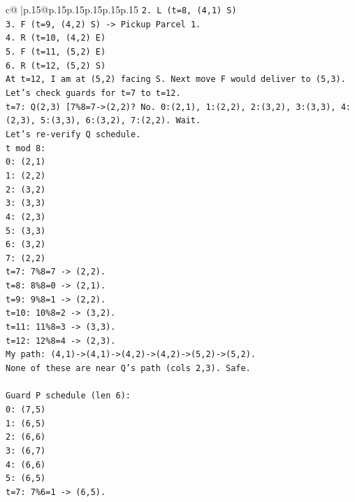 \documentclass{article}
\begin{document}
{\begin{supertabular}{c@{$\;$}|p{.15\linewidth}@{}p{.15\linewidth}p{.15\linewidth}p{.15\linewidth}p{.15\linewidth}p{.15\linewidth}}
{{{\texttt{2. L (t=8, (4,1) S)} \\
\texttt{3. F (t=9, (4,2) S) {-}> Pickup Parcel 1.} \\
\texttt{4. R (t=10, (4,2) E)} \\
\texttt{5. F (t=11, (5,2) E)} \\
\texttt{6. R (t=12, (5,2) S)} \\
\texttt{At t=12, I am at (5,2) facing S. Next move F would deliver to (5,3).} \\
\texttt{Let's check guards for t=7 to t=12.} \\
\texttt{t=7: Q(2,3) {[}7\%8=7{-}>(2,2)? No. 0:(2,1), 1:(2,2), 2:(3,2), 3:(3,3), 4:(2,3), 5:(3,3), 6:(3,2), 7:(2,2). Wait.} \\
\texttt{Let's re{-}verify Q schedule.} \\
\texttt{t mod 8:} \\
\texttt{0: (2,1)} \\
\texttt{1: (2,2)} \\
\texttt{2: (3,2)} \\
\texttt{3: (3,3)} \\
\texttt{4: (2,3)} \\
\texttt{5: (3,3)} \\
\texttt{6: (3,2)} \\
\texttt{7: (2,2)} \\
\texttt{t=7: 7\%8=7 {-}> (2,2).} \\
\texttt{t=8: 8\%8=0 {-}> (2,1).} \\
\texttt{t=9: 9\%8=1 {-}> (2,2).} \\
\texttt{t=10: 10\%8=2 {-}> (3,2).} \\
\texttt{t=11: 11\%8=3 {-}> (3,3).} \\
\texttt{t=12: 12\%8=4 {-}> (2,3).} \\
\texttt{My path: (4,1){-}>(4,1){-}>(4,2){-}>(4,2){-}>(5,2){-}>(5,2).} \\
\texttt{None of these are near Q's path (cols 2,3). Safe.} \\
\\ 
\texttt{Guard P schedule (len 6):} \\
\texttt{0: (7,5)} \\
\texttt{1: (6,5)} \\
\texttt{2: (6,6)} \\
\texttt{3: (6,7)} \\
\texttt{4: (6,6)} \\
\texttt{5: (6,5)} \\
\texttt{t=7: 7\%6=1 {-}> (6,5).} \\
}}}
\end{supertabular}}
\end{document}
